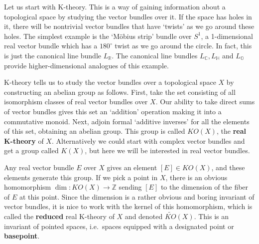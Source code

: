 \documentclass[12pt]{article}
\newcommand\Z{{\mathbb Z}}
\newcommand\R{{\mathbb R}}
\newcommand\C{{\mathbb C}}
\renewcommand\H{{\mathbb H}}
\renewcommand\O{{\mathbb O}}
\newcommand{\maps}{\colon}
\begin{document}
Let us start with K-theory.   This is a way of gaining information about 
a topological space by studying the vector bundles over it.  If the  
space has holes in it, there will be nontrivial vector bundles that  
have `twists' as we go around these holes.  The simplest example is   
the `M\"obius strip' bundle over $S^1$, a 1-dimensional real vector 
bundle which has a $180^\circ$ twist as we go around the circle.  In  
fact, this is just the canonical line bundle $L_\R$.   The canonical 
line bundles $L_\C, L_\H$ and $L_\O$ provide higher-dimensional 
analogues of this example. 
 
K-theory tells us to study the vector bundles over a topological space
$X$ by constructing an abelian group as follows.  First, take the set
consisting of all isomorphism classes of real vector bundles over $X$.
Our ability to take direct sums of vector bundles gives this set an
`addition' operation making it into a commutative monoid.  Next, adjoin
formal `additive inverses' for all the elements of this set, obtaining
an abelian group.  This group is called $KO(X)$, the {\bf real K-theory}
of $X$.  Alternatively we could start with complex vector bundles and 
get a group called $K(X)$, but here we will be interested in real vector
bundles.
 
Any real vector bundle $E$ over $X$ gives an element $[E] \in KO(X)$, and 
these elements generate this group.  If we pick a point in $X$, there is an
obvious homomorphism $\dim \maps KO(X) \to \Z$ sending $[E]$ to the
dimension of the fiber of $E$ at this point.  Since the dimension is a
rather obvious and boring invariant of vector bundles, it is nice to
work with the kernel of this homomorphism, which is called the {\bf
reduced} real K-theory of $X$ and denoted $\widetilde{KO}(X)$.  This is
an invariant of pointed spaces, i.e.\ spaces equipped with a designated
point or {\bf basepoint}.
 
\end{document}
